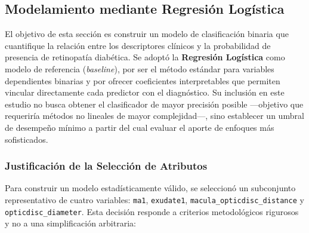 \subsection{Modelamiento mediante Regresión Logística}

El objetivo de esta sección es construir un modelo de clasificación binaria que
cuantifique la relación entre los descriptores clínicos y la probabilidad de presencia
de retinopatía diabética. Se adoptó la \textbf{Regresión Logística} como modelo de
referencia (\textit{baseline}), por ser el método estándar para variables dependientes
binarias y por ofrecer coeficientes interpretables que permiten vincular directamente
cada predictor con el diagnóstico. Su inclusión en este estudio no busca obtener el
clasificador de mayor precisión posible —objetivo que requeriría métodos no lineales
de mayor complejidad—, sino establecer un umbral de desempeño mínimo a partir del
cual evaluar el aporte de enfoques más sofisticados.

\subsubsection{Justificación de la Selección de Atributos}

Para construir un modelo estadísticamente válido, se seleccionó un subconjunto
representativo de cuatro variables: \texttt{ma1}, \texttt{exudate1},
\texttt{macula\_opticdisc\_distance} y \texttt{opticdisc\_diameter}. Esta decisión
responde a criterios metodológicos rigurosos y no a una simplificación arbitraria:


